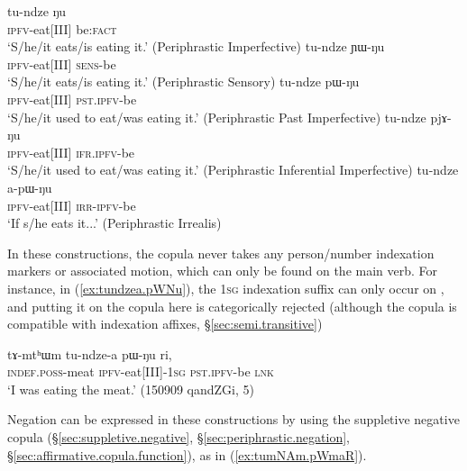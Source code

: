 \begin{exe}
\ex \label{ex:tundze.periphrastic}
\begin{xlist}
\ex \label{ex:tundze.Nu}
\gll tu-ndze ŋu \\
\textsc{ipfv}-eat[III] be:\textsc{fact} \\
\glt `S/he/it eats/is eating it.' (Periphrastic Imperfective)
\ex \label{ex:tundze.YWNu}
\gll tu-ndze ɲɯ-ŋu \\
\textsc{ipfv}-eat[III] \textsc{sens}-be  \\
\glt `S/he/it eats/is eating it.' (Periphrastic Sensory)
\ex \label{ex:tundze.pWNu}
\gll tu-ndze pɯ-ŋu \\
\textsc{ipfv}-eat[III] \textsc{pst}.\textsc{ipfv}-be  \\
\glt `S/he/it used to eat/was eating it.' (Periphrastic Past Imperfective)
\ex \label{ex:tundze.pjANu}
\gll tu-ndze pjɤ-ŋu \\
\textsc{ipfv}-eat[III] \textsc{ifr}.\textsc{ipfv}-be  \\
\glt `S/he/it used to eat/was eating it.' (Periphrastic Inferential Imperfective)
\ex \label{ex:tundze.apWNu}
\gll tu-ndze a-pɯ-ŋu \\
\textsc{ipfv}-eat[III] \textsc{irr}-\textsc{ipfv}-be  \\
\glt `If s/he eats it...' (Periphrastic Irrealis)
\end{xlist}
\end{exe}

In these constructions, the copula never takes any person/number indexation markers or associated motion, which can only be found on the main verb. For instance, in (\ref{ex:tundzea.pWNu}), the \textsc{1sg} indexation suffix  can only occur on , and putting it on the copula  here is categorically rejected (although the copula  is compatible with indexation affixes, §\ref{sec:semi.transitive})

\begin{exe}
\ex \label{ex:tundzea.pWNu}
\gll  tɤ-mtʰɯm tu-ndze-a pɯ-ŋu ri, \\
\textsc{indef}.\textsc{poss}-meat \textsc{ipfv}-eat[III]-\textsc{1sg} \textsc{pst}.\textsc{ipfv}-be \textsc{lnk} \\
\glt `I was eating the meat.' (150909 qandZGi, 5)
\end{exe}

Negation can be expressed in these constructions by using the suppletive negative copula  (§\ref{sec:suppletive.negative}, §\ref{sec:periphrastic.negation}, §\ref{sec:affirmative.copula.function}), as in (\ref{ex:tumNAm.pWmaR}).


